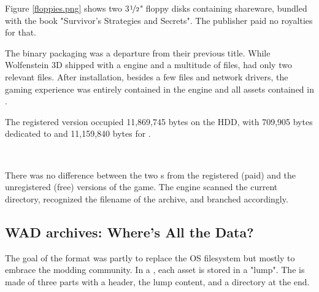 \par
\vspace{-10pt}
Figure \ref{floppies.png} shows two 3$\nicefrac{1}{2}$" floppy disks containing \doom{} shareware, bundled with the book "Survivor's Strategies and Secrets". The publisher paid no royalties for that.\\
\par
The binary packaging was a departure from their previous title. While Wolfenstein 3D shipped with a  engine and a multitude of  files, \doom{} had only two relevant files. After installation, besides a few  files and network drivers, the gaming experience was entirely contained in the engine  and all assets contained in .\\
\vspace{3mm}

\vspace{2mm}
The registered version occupied 11,869,745 bytes on the HDD, with 709,905 bytes dedicated to  and 11,159,840 bytes for .
\pagebreak

\\
\par
There was no difference between the two s from the registered (paid) and the unregistered (free) versions of the game. The engine scanned the current directory, recognized the filename of the  archive, and branched accordingly.\\
\par
{}
%  




\subsection{WAD archives: Where's All the Data?}
\label{wad_explained}
The goal of the  format was partly to replace the OS filesystem but mostly to embrace the modding community. In a , each asset is stored in a "lump". The  is made of three parts with a header, the lump content, and a directory at the end.\\

